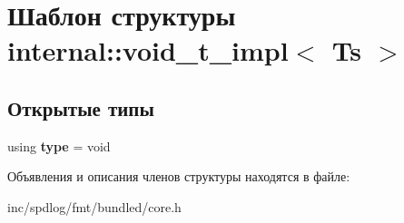 \hypertarget{structinternal_1_1void__t__impl}{}\section{Шаблон структуры internal\+:\+:void\+\_\+t\+\_\+impl$<$ Ts $>$}
\label{structinternal_1_1void__t__impl}
\subsection*{Открытые типы}
\begin{DoxyCompactItemize}
\item 
\mbox{\label{structinternal_1_1void__t__impl_ae9c7c309e193e83efaaae627d8df89e1}} 
using {\bfseries type} = void
\end{DoxyCompactItemize}


Объявления и описания членов структуры находятся в файле\+:\begin{DoxyCompactItemize}
\item 
inc/spdlog/fmt/bundled/core.\+h\end{DoxyCompactItemize}
